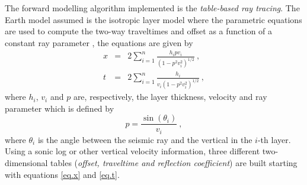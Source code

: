 \documentclass{vie16}
\begin{document}
The forward modelling algorithm implemented is the
\textit{table-based ray tracing}. The Earth model assumed is the
isotropic layer model where the parametric equations are
used to compute the two-way traveltimes and offset as a function
of a constant ray parameter \citep{Slotnick1959}, the
equations are given by
\begin{eqnarray} x & = & 2\sum_{i=1}^{n} \frac {h_{i}pv_{i}} {(1
		- p^{2}v_{i}^{2})^{1/2}} \ ,\label{eq.x} \\ t & = &
		2\sum_{i=1}^{n} \frac {h_{i}} {v_{i}(1 -
		p^{2}v_{i}^{2})^{1/2}} \ , \label{eq.t} \end{eqnarray}
%
where $h_{i}$, $v_{i}$ and $p$ are, respectively, the
layer thickness, velocity and ray parameter which is
defined by
\begin{equation}
p = \frac{\sin(\theta_{i})}{v_{i}}\ ,\label{eq.p}
\end{equation}
where $\theta_i$ is the angle between the seismic ray and the
vertical in the $i$-th layer. Using a sonic log or other
vertical velocity information, three different
two-dimensional tables (\textit{offset, traveltime and
reflection coefficient}) are built starting with equations
\ref{eq.x} and \ref{eq.t}.
\end{document}
